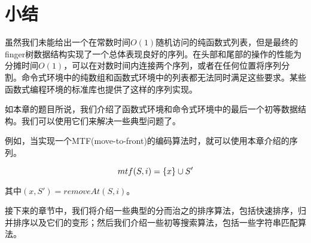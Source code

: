 \documentclass[UTF8]{article}
\begin{document}
\section{小结}

虽然我们未能给出一个在常数时间$O(1)$随机访问的纯函数式列表，但是最终的finger树数据结构实现了一个总体表现良好的序列。在头部和尾部的操作的性能为分摊时间$O(1)$，可以在对数时间内连接两个序列，或者在任何位置将序列分割。命令式环境中的纯数组和函数式环境中的列表都无法同时满足这些要求。某些函数式编程环境的标准库也提供了这样的序列实现\cite{hackage-ftr}。

如本章的题目所说，我们介绍了函数式环境和命令式环境中的最后一个初等数据结构。我们可以使用它们来解决一些典型问题了。

例如，当实现一个MTF(move-to-front)的编码算法时\cite{mtf-wiki}，就可以使用本章介绍的序列。

\[
mtf(S, i) = \{x\} \cup S' \\
\]

其中$(x, S') = removeAt(S, i)$。

接下来的章节中，我们将介绍一些典型的分而治之的排序算法，包括快速排序，归并排序以及它们的变形；然后我们介绍一些初等搜索算法，包括一些字符串匹配算法。


\ifx\wholebook\relax \else
\end{document}
